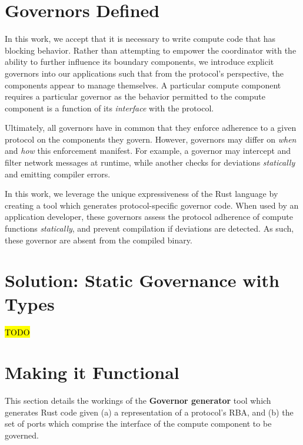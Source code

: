 \section{Governors Defined}
\label{sec:governor}
In this work, we accept that it is necessary to write compute code that has blocking behavior. Rather than attempting to empower the coordinator with the ability to further influence its boundary components, we introduce explicit governors into our applications such that from the protocol's perspective, the components appear to manage themselves. A particular compute component requires a particular governor as the behavior permitted to the compute component is a function of its \textit{interface} with the protocol.

Ultimately, all governors have in common that they enforce adherence to a given protocol on the components they govern. However, governors may differ on \textit{when} and \textit{how} this enforcement manifest. For example, a governor may intercept and filter network messages at runtime, while another checks for deviations \textit{statically} and emitting compiler errors.

In this work, we leverage the unique expressiveness of the Rust language by creating a tool which generates protocol-specific governor code. When used by an application developer, these governors assess the protocol adherence of compute functions \textit{statically}, and prevent compilation if deviations are detected. As such, these governor are absent from the compiled binary.

\section{Solution: Static Governance with Types}
\hl{TODO}

\section{Making it Functional}
This section details the workings of the \textbf{Governor generator} tool which generates Rust code given (a) a representation of a protocol's RBA, and (b) the set of ports which comprise the interface of the compute component to be governed.

